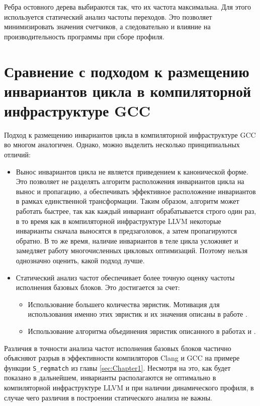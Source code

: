 Ребра остовного дерева выбираются так, что их частота максимальна.
Для этого используется статический анализ частоты переходов.
Это позволяет минимизировать значения счетчиков, а следовательно и влияние на производительность программы при сборе профиля.

\section{Сравнение с подходом к размещению инвариантов цикла в компиляторной инфраструктуре GCC}

Подход к размещению инвариантов цикла в компиляторной инфраструктуре GCC во многом аналогичен.
Однако, можно выделить несколько принципиальных отличий:
\begin{itemize}
    \item Вынос инвариантов цикла не является приведением к канонической форме.
        Это позволяет не разделять алгоритм расположения инвариантов цикла на вынос и пропагацию, а обеспечивать эффективное расположение инвариантов в рамках единственной трансформации.
        Таким образом, алгоритм может работать быстрее, так как каждый инвариант обрабатывается строго один раз, в то время как в компиляторной инфраструктуре LLVM некоторые инварианты сначала выносятся в предзаголовок, а затем пропагируются обратно.
        В то же время, наличие инвариантов в теле цикла усложняет и замедляет работу многочисленных цикловых оптимизаций.
        Поэтому нельзя однозначно оценить, какой подход лучше.
    \item Статический анализ частот обеспечивает более точную оценку частоты исполнения базовых блоков.
        Это достигается за счет:
    \begin{itemize}
        \item Использование большего количества эвристик.
            Мотивация для использования именно этих эвристик и их значения описаны в работе \cite{Ball_Larus_1993}.
        \item Использование алгоритма объединения эвристик описанного в работах \cite{Youfeng_Wu_Larus} и \cite{Calder_Grunwald_Lindsay_Martin_Mozer_Zorn_1995}.
    \end{itemize}
\end{itemize}

Различия в точности анализа частот исполнения базовых блоков частично объясняют разрыв в эффективности компиляторов Clang и GCC на примере функции \texttt{S\_regmatch} из главы \ref{sec:Chapter1}.
Несмотря на это, как будет показано в дальнейшем, инварианты располагаются не оптимально в компиляторной инфраструктуре LLVM и при наличии динамического профиля, в случае чего различия в построении статического анализа не важны.

\newpage
